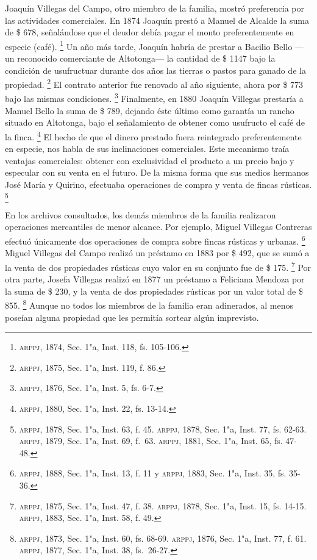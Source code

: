 \documentclass[14pt,twoside,final]{extbook} %
\let\oldfootnote\footnote
\renewcommand\footnote[1]{%
\oldfootnote{\hspace{1mm}#1}}
\begin{document}
Joaquín Villegas del Campo, otro miembro de la familia, mostró preferencia por las actividades comerciales. En 1874 Joaquín prestó a Manuel de Alcalde la suma de \$ 678, señalándose que el deudor debía pagar el monto preferentemente en especie (café).\footnote{\textsc{arppj}, 1874, Sec. 1"a, Inst. 118, fs. 105-106.} Un año más tarde, Joaquín habría de prestar a Bacilio Bello ---un reconocido comerciante de Altotonga--- la cantidad de \$ 1147 bajo la condición de usufructuar durante dos años las tierras o pastos para ganado de la propiedad.\footnote{\textsc{arppj}, 1875, Sec. 1"a, Inst. 119, f. 86.} El contrato anterior fue renovado al año siguiente, ahora por \$ 773 bajo las mismas condiciones.\footnote{\textsc{arppj}, 1876, Sec. 1"a, Inst. 5, fs. 6-7.} Finalmente, en 1880 Joaquín Villegas prestaría a Manuel Bello la suma de \$ 789, dejando éste último como garantía un rancho situado en Altotonga, bajo el señalamiento de obtener como usufructo el café de la finca.\footnote{\textsc{arppj}, 1880, Sec. 1"a, Inst. 22, fs. 13-14.} El hecho de que el dinero prestado fuera reintegrado preferentemente en especie, nos habla de sus inclinaciones comerciales. Este mecanismo traía ventajas comerciales: obtener con exclusividad el producto a un precio bajo y especular con su venta en el futuro. De la misma forma que sus medios hermanos José María y Quirino, efectuaba operaciones de compra y venta de fincas rústicas.\footnote{\textsc{arppj}, 1878, Sec. 1"a, Inst. 63, f. 45. \textsc{arppj}, 1878, Sec. 1"a, Inst. 77, fs. 62-63. \textsc{arppj}, 1879, Sec. 1"a, Inst. 69, f.~63. \textsc{arppj}, 1881, Sec. 1"a, Inst. 65, fs. 47-48.}

En los archivos consultados, los demás miembros de la familia realizaron operaciones mercantiles de menor alcance. Por ejemplo, Miguel Villegas Contreras efectuó únicamente dos operaciones de compra sobre fincas rústicas y urbanas.\footnote{\textsc{arppj}, 1888, Sec. 1"a, Inst. 13, f. 11 y \textsc{arppj}, 1883, Sec. 1"a, Inst. 35, fs. 35-36.} Miguel Villegas del Campo realizó un préstamo en 1883 por \$ 492, que se sumó a la venta de dos propiedades rústicas cuyo valor en su conjunto fue de \$ 175.\footnote{\textsc{arppj}, 1875, Sec. 1"a, Inst. 47, f. 38. \textsc{arppj}, 1878, Sec. 1"a, Inst. 15, fs. 14-15. \textsc{arppj}, 1883, Sec. 1"a, Inst. 58, f. 49.} Por otra parte, Josefa Villegas realizó en 1877 un préstamo a Feliciana Mendoza por la suma de \$ 230, y la venta de dos propiedades rústicas por un valor total de \$ 855.\footnote{\textsc{arppj}, 1873, Sec. 1"a, Inst. 60, fs. 68-69. \textsc{arppj}, 1876, Sec. 1"a, Inst. 77, f. 61. \textsc{arppj}, 1877, Sec. 1"a, Inst. 38, fs.~26-27.} Aunque no todos los miembros de la familia eran adinerados, al menos poseían alguna propiedad que les permitía sortear algún imprevisto.
\end{document}
